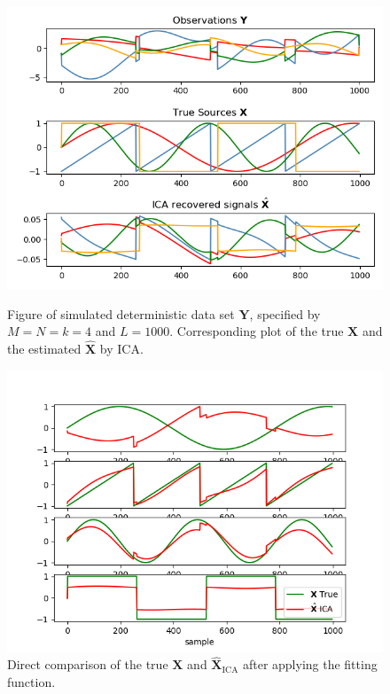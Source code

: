\begin{figure}[H]
\begin{widepage}
    \begin{minipage}[t]{.45\textwidth}
		\centering
		\includegraphics[scale=0.45]{figures/ICAapp/ICA_app1.png}
	\caption{Figure of simulated deterministic data set $\mathbf{Y}$, specified by $M = N = k = 4$ and $L = 1000$. Corresponding plot of the true $\mathbf{X}$ and the estimated $\hat{\mathbf{X}}$ by ICA.}
	\label{fig:appica1}
    \end{minipage} 
    \hfill
    \begin{minipage}[t]{.45\textwidth}
		\centering
		\includegraphics[scale=0.45]{figures/ICAapp/ICA_app2.png}
	\caption{Direct comparison of the true $\mathbf{X}$ and $\hat{\mathbf{X}}_{\text{ICA}}$ after applying the fitting function.}
	\label{fig:appica2}
    \end{minipage}
\end{widepage}
\end{figure}
